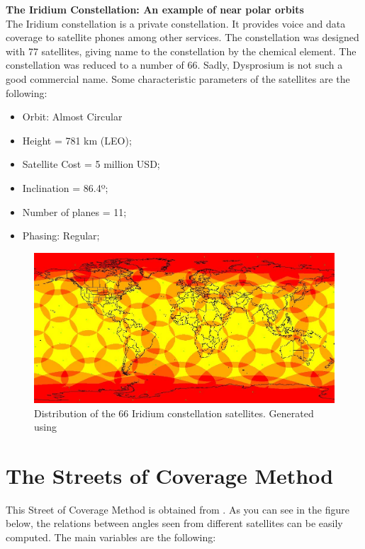 \textbf{The Iridium Constellation: An example of near polar orbits\cite{Iridium}}
\\
The Iridium constellation is a private constellation. It provides voice and data coverage to satellite phones among other services. The constellation was designed with 77 satellites, giving name to the constellation by the chemical element. The constellation was reduced to a number of 66. Sadly, Dysprosium is not such a good commercial name. Some characteristic parameters of the satellites are the following:

\begin{itemize}
\item Orbit: Almost Circular
\item Height = 781 km (LEO);
\item Satellite Cost = 5 million USD;
\item Inclination = 86.4º;
\item Number of planes = 11;
\item Phasing: Regular;
\end{itemize}

\begin{figure}[H]
\begin{center}
\includegraphics[scale=0.6]{PolarOrbits/Iridium.jpg}
\caption{Distribution of the 66 Iridium constellation satellites. Generated using \cite{SaVi}}
\end{center}
\end{figure} 
\newpage

\section{The Streets of Coverage Method}
This  Street of Coverage Method is obtained from 
\cite{Chobotov2002}. As you can see in the figure below,
 the relations between angles seen from different satellites can
 be easily computed. The main variables are the following:

